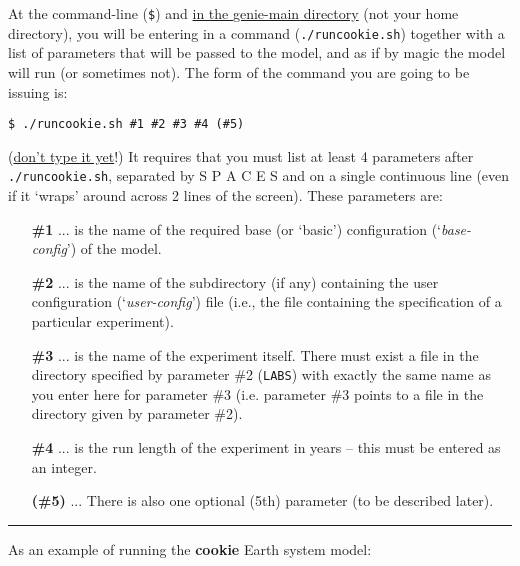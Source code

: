 At the command-line (\texttt{\$}) and \uline{in the \textsf{\footnotesize genie-main} directory} (not your home directory), you will be entering in a command (\texttt{./runcookie.sh}) together with a list of parameters that will be passed to the model, and as if by magic the model will run (or sometimes not). The form of the command you are going to be issuing is:

\vspace{-1mm}\begin{verbatim}
$ ./runcookie.sh #1 #2 #3 #4 (#5)
\end{verbatim}\vspace{-1mm}

\noindent(\uline{don't type it yet}!) It requires that you must list at least 4 parameters after \texttt{./runcookie.sh}, separated by S P A C E S and on a single continuous line (even if it ‘wraps’ around across 2 lines of the screen).
These parameters are:

\vspace{2mm}
\begin{enumerate}[noitemsep]
\setlength{\itemindent}{.2in}
\item[\textbf{\#1}] ... is the name of the required base (or ‘basic’) configuration (‘\textit{base-config}’) of the model.
\item[\textbf{\#2}] ... is the name of the subdirectory (if any) containing the user configuration (‘\textit{user-config}’) file (i.e., the file containing the specification of a particular experiment).
\item[\textbf{\#3}] ... is the name of the experiment itself. There must exist a file in the directory specified by parameter \#2 (\texttt{LABS}) with exactly the same name as you enter here for parameter \#3 (i.e. parameter \#3 points to a file in the directory given by parameter \#2).
\item[\textbf{\#4}] ... is the run length of the experiment in years – this must be entered as an integer.
\item[\textbf{(\#5)}] ... There is also one optional (5th) parameter (to be described later).
\end{enumerate}

\vspace{1mm}\noindent\rule{4cm}{0.5pt}\vspace{2mm}

\noindent As an example of running the \textbf{cookie} Earth system model:

